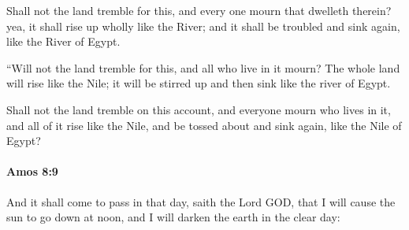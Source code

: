			\begin{versebox}
					\item[BHS] 
					\item[LXX] 
					\item[ASV] Shall not the land tremble for this, and every one mourn that dwelleth therein? yea, it shall rise up wholly like the River; and it shall be troubled and sink again, like the River of Egypt.
					\item[NIV] “Will not the land tremble for this, and all who live in it mourn? The whole land will rise like the Nile; it will be stirred up and then sink like the river of Egypt.
					\item[NRSV] Shall not the land tremble on this account, and everyone mourn who lives in it, and all of it rise like the Nile, and be tossed about and sink again, like the Nile of Egypt?
			\end{versebox}

		\paragraph{Amos 8:9} %
			\label{AMOS-8-9}

			And it shall come to pass in that day, saith the Lord GOD, that I will cause the sun to go down at noon, and I will darken the earth in the clear day:

